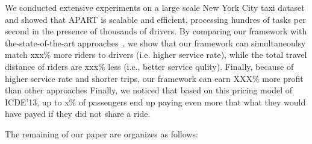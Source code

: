 We conducted extensive experiments on a large scale New York City taxi dataset and showed that APART is scalable and efficient, processing hundres of tasks per second in the presence of thousands of drivers. By comparing our framework with the-state-of-the-art approaches~\cite{Huang14}, we show that our framework can simultaneoulsy match xxx\% more riders to drivers (i.e. higher service rate), while the total travel distance of riders are xxx\% less (i.e., better service qulity). Finally, because of higher service rate and shorter trips, our framework can earn XXX\% more profit than other approaches
Finally, we noticed that based on this pricing model of ICDE'13, up to x\% of passengers end up paying even more that what they would have payed if they did not share a ride.

The remaining of our paper are organizes as follows:








